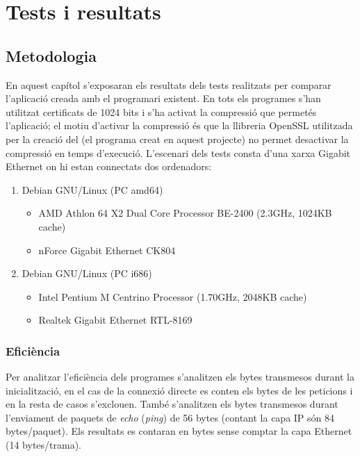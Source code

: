 \chapter{Tests i resultats}
\section{Metodologia}
En aquest capítol s'exposaran els resultats dels tests realitzats per comparar l'aplicació creada amb el programari existent.
En tots els programes s'han utilitzat certificats de 1024 bits i s'ha activat la compressió que permetés l'aplicació; el motiu d'activar la compressió és que la llibreria OpenSSL utilitzada per la creació del  (el programa creat en aquest projecte) no permet desactivar la compressió en temps d'execució.
L'escenari dels tests consta d'una xarxa Gigabit Ethernet on hi estan connectats dos ordenadors:
\begin{enumerate}
\item Debian GNU/Linux (PC amd64)
\begin{itemize}
\item AMD Athlon 64 X2 Dual Core Processor BE-2400 (2.3GHz, 1024KB cache)
\item nForce Gigabit Ethernet CK804
\end{itemize}
\item Debian GNU/Linux (PC i686)
\begin{itemize}
\item Intel Pentium M Centrino Processor (1.70GHz, 2048KB cache)
\item Realtek Gigabit Ethernet RTL-8169
\end{itemize}
\end{enumerate}
\subsection{Eficiència}
Per analitzar l'eficiència dels programes s'analitzen els bytes transmesos durant la inicialització, en el cas de la connexió directe es conten els bytes de les peticions  i en la resta de casos s'exclouen.
També s'analitzen els bytes transmesos durant l'enviament de paquets  de \emph{echo} (\emph{ping}) de 56 bytes (contant la capa IP són 84 bytes/paquet).
Els resultats es contaran en bytes sense comptar la capa Ethernet (14 bytes/trama).

